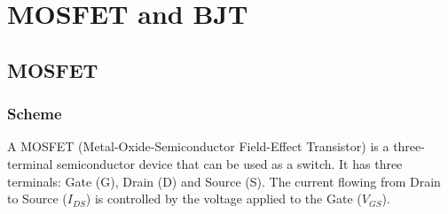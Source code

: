 \section{MOSFET and BJT}
\subsection{MOSFET}
\subsubsection*{Scheme}
A MOSFET (Metal-Oxide-Semiconductor Field-Effect Transistor) is a three-terminal semiconductor device that can be used as
a switch. It has three terminals: Gate (G), Drain (D) and Source (S). The current flowing from Drain to Source (\(I_{DS}\))
is controlled by the voltage applied to the Gate (\(V_{GS}\)).

